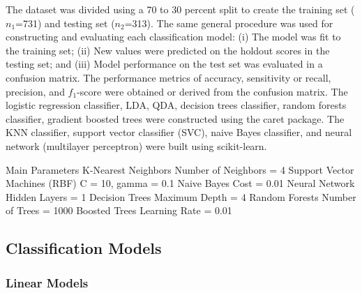 \documentclass[sigconf]{acmart}
\begin{document}
The dataset was divided using a 70 to 30 percent split to create the training
set ($n_1$=731) and testing set ($n_2$=313). The same general procedure 
was used for constructing and evaluating each classification model: (i) The 
model was fit to the training set; (ii) New values were predicted on the 
holdout scores in the testing set; and (iii) Model performance on the test 
set was evaluated in a confusion matrix. The performance metrics of accuracy, 
sensitivity or recall, precision, and $f_1$-score were obtained or derived 
from the confusion matrix. The logistic regression classifier, LDA, QDA, 
decision trees classifier, random forests classifier, gradient boosted trees 
were constructed using the caret package. The KNN classifier, support 
vector classifier (SVC), naive Bayes classifier, and neural network 
(multilayer perceptron) were built using scikit-learn. 






Main Parameters
K-Nearest Neighbors  Number of Neighbors = 4 
Support Vector Machines (RBF)  C = 10, gamma = 0.1
Naive Bayes  Cost = 0.01 
Neural Network  Hidden Layers = 1
Decision Trees  Maximum Depth = 4
Random Forests  Number of Trees = 1000 
Boosted Trees  Learning Rate = 0.01 









\subsection{Classification Models}

\subsubsection{Linear Models}
\end{document}

